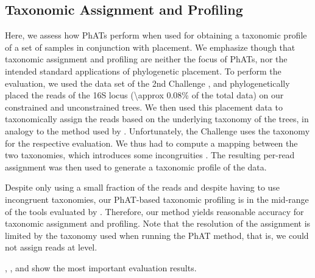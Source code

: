 
\subsection{Taxonomic Assignment and Profiling}
\label{ch:AutomaticTrees:sec:Evaluation:sub:TaxonomicAssignmentProfiling}

Here, we assess how \acp{PhAT} perform when used for obtaining a taxonomic profile of a set of samples in conjunction with placement.
We emphasize though that taxonomic assignment and profiling are neither the focus of \acp{PhAT},
nor the intended standard applications of phylogenetic placement.
To perform the evaluation,
we used the  data set of the 2nd  Challenge \citep{Sczyrba2017,Bremges2018},
and phylogenetically placed the reads of the  16S locus (\num{\approx 0.08}\% of the total data)
on our constrained and unconstrained  trees.
We then used this placement data to taxonomically assign the reads
based on the underlying  taxonomy of the trees,
in analogy to the method used by  \citep{Kozlov2016}.
Unfortunately, the  Challenge uses the  taxonomy for the respective evaluation.
We thus had to compute a mapping between the two taxonomies, which introduces some incongruities \citep{Balvociute2017}.
The resulting per-read assignment was then used to generate a taxonomic profile of the data.

Despite only using a small fraction of the reads and despite having to use incongruent taxonomies,
our PhAT-based taxonomic profiling is in the mid-range of the tools evaluated by .
Therefore, our method yields reasonable accuracy for taxonomic assignment and profiling.
Note that the resolution of the assignment is limited by the taxonomy used when running the \ac{PhAT} method,
that is, we could not assign reads at  level.


, , and  show the most important evaluation results.

